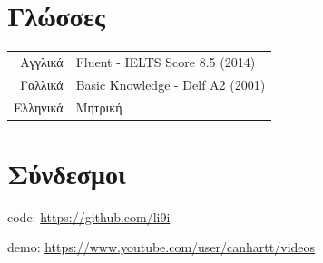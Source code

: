 \documentclass[a4paper,10pt,twoside]{article}
\begin{document}

\section{Γλώσσες}

\begin{tabular}{rp{12cm}}
Αγγλικά & Fluent - IELTS Score 8.5 (2014) \\
Γαλλικά & Basic Knowledge - Delf A2 (2001) \\
Ελληνικά & Μητρική
\end{tabular}



\section{Σύνδεσμοι}
code: \url{https://github.com/li9i}

demo: \url{https://www.youtube.com/user/canhartt/videos}
\end{document}
